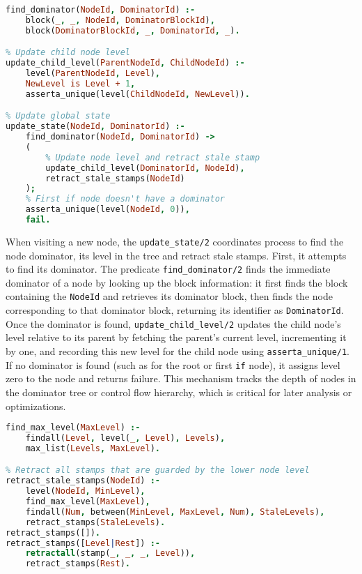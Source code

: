 \smallbreak
\begin{lstlisting}[language=Prolog]
% Predicate to find dominator of a block
find_dominator(NodeId, DominatorId) :-
    block(_, _, NodeId, DominatorBlockId),
    block(DominatorBlockId, _, DominatorId, _).

% Update child node level
update_child_level(ParentNodeId, ChildNodeId) :-
    level(ParentNodeId, Level),
    NewLevel is Level + 1,
    asserta_unique(level(ChildNodeId, NewLevel)).

% Update global state
update_state(NodeId, DominatorId) :-
    find_dominator(NodeId, DominatorId) ->
    (
        % Update node level and retract stale stamp
        update_child_level(DominatorId, NodeId),
        retract_stale_stamps(NodeId)
    );
    % First if node doesn't have a dominator
    asserta_unique(level(NodeId, 0)),
    fail.
\end{lstlisting}
\smallbreak
When visiting a new node, the \texttt{update\_state/2} coordinates process to find the node dominator, its level in the tree and retract stale stamps. First, it attempts to find its dominator. 
The predicate \texttt{find\_dominator/2} finds the immediate dominator of a node by looking up the block information: it first finds the block containing the \texttt{NodeId} and retrieves its dominator block, then finds the node corresponding to that dominator block, returning its identifier as \texttt{DominatorId}. 
Once the dominator is found, \texttt{update\_child\_level/2} updates the child node’s level relative to its parent by fetching the parent’s current level, incrementing it by one, and recording this new level for the child node using \texttt{asserta\_unique/1}. 
If no dominator is found (such as for the root or first \texttt{if} node), it assigns level zero to the node and returns failure. 
This mechanism tracks the depth of nodes in the dominator tree or control flow hierarchy, which is critical for later analysis or optimizations.

\begin{lstlisting}[language=Prolog]
% Predicate to find the maximum levels of the tree
find_max_level(MaxLevel) :-
    findall(Level, level(_, Level), Levels),
    max_list(Levels, MaxLevel).

% Retract all stamps that are guarded by the lower node level
retract_stale_stamps(NodeId) :-
    level(NodeId, MinLevel),
    find_max_level(MaxLevel),
    findall(Num, between(MinLevel, MaxLevel, Num), StaleLevels),
    retract_stamps(StaleLevels).
retract_stamps([]).
retract_stamps([Level|Rest]) :-
    retractall(stamp(_, _, _, Level)),
    retract_stamps(Rest).
\end{lstlisting}

